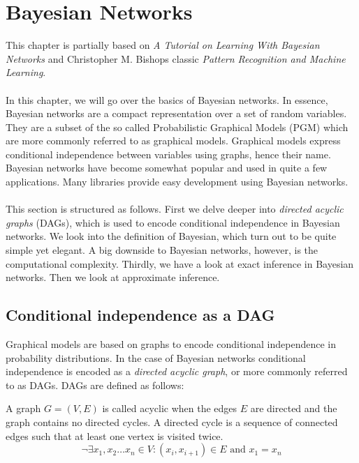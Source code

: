 \renewcommand{\this}{BayesianNetworks}

\chapter{Bayesian Networks}
This chapter is partially based on 
\textit{A Tutorial on Learning With Bayesian Networks} and Christopher
M. Bishops classic \textit{Pattern Recognition and Machine Learning}.
\\\\
In this chapter, we will go over the basics of 
Bayesian networks. In essence, Bayesian networks
are a compact representation over a set of
random variables. They are a subset of the so called
Probabilistic Graphical Models (PGM) which are more
commonly referred to as graphical models. Graphical
models express conditional independence between 
variables using graphs, hence their name.
Bayesian networks have become somewhat popular and
used in quite a few applications. Many libraries
provide easy development using Bayesian networks.
\\\\
This section is structured as follows. First we delve
deeper into \textit{directed acyclic graphs} (DAGs), which
is used to encode conditional independence in Bayesian
networks. We look into the definition of Bayesian,
which turn out to be quite simple yet elegant. A
big downside to Bayesian networks, however, is the
computational complexity. Thirdly, we have a look 
at exact inference in Bayesian networks. Then we
look at approximate inference.

\section{Conditional independence as a DAG}
Graphical models are based on graphs to encode conditional independence 
in probability distributions. In the case of Bayesian networks conditional
independence is encoded as a \textit{directed acyclic graph}, or more 
commonly referred to as DAGs. DAGs are defined as follows:

\begin{defn}
A graph $G = (V, E)$ is called acyclic when the edges $E$ are directed
and the graph contains no directed cycles. A directed cycle is a 
sequence of connected edges such that at least one vertex is visited 
twice.
\begin{equation}
\lnot \exists x_1, x_2 \dots x_n \in V: (x_i, x_{i+1}) \in E \text{ and }
	x_1 = x_n
\end{equation}
\end{defn}

